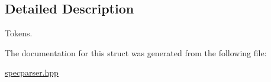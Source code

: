 \subsection{Detailed Description}
Tokens. 

The documentation for this struct was generated from the following file\+:\begin{DoxyCompactItemize}
\item 
\hyperlink{specparser_8hpp}{specparser.\+hpp}\end{DoxyCompactItemize}
